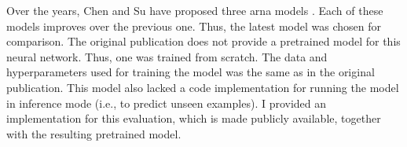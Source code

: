 
Over the years, Chen and Su have proposed three \gls{arna}
models \parencite{chen2018functional, chen2019harmony,
chen2021attend}. Each of these models improves over the
previous one. Thus, the latest model
\parencite{chen2021attend} was chosen for comparison. The
original publication does not provide a pretrained model for
this neural network. Thus, one was trained from scratch. The
data and hyperparameters used for training the model was the
same as in the original publication. This model also lacked
a code implementation for running the model in inference
mode (i.e., to predict unseen examples). I provided an
implementation for this evaluation, which is made publicly
available, together with the resulting pretrained
model.
